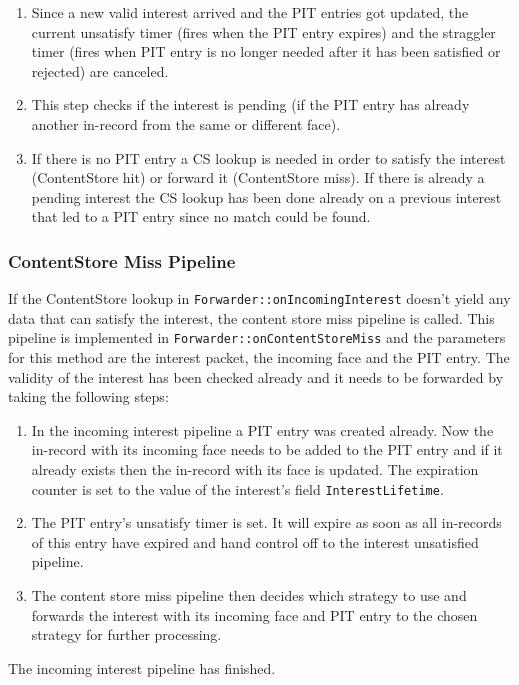 \begin{enumerate}
\item Since a new valid interest arrived and the PIT entries got updated, the current unsatisfy timer (fires when the PIT entry expires) and the straggler timer (fires when PIT entry is no longer needed after it has been satisfied or rejected) are canceled.
\item This step checks if the interest is pending (if the PIT entry has already another in-record from the same or different face).
\item If there is no PIT entry a CS lookup is needed in order to satisfy the interest (ContentStore hit) or forward it (ContentStore miss). If there is already a pending interest the CS lookup has been done already on a previous interest that led to a PIT entry since no match could be found.
\end{enumerate}

\subsubsection{ContentStore Miss Pipeline}

If the ContentStore lookup in \texttt{Forwarder::onIncomingInterest} doesn't yield any data that can satisfy the interest, the content store miss pipeline is called. This pipeline is implemented in \texttt{Forwarder::onContentStoreMiss} and the parameters for this method are the interest packet, the incoming face and the PIT entry. The validity of the interest has been checked already and it needs to be forwarded by taking the following steps:

\begin{enumerate}
\item In the incoming interest pipeline a PIT entry was created already. Now the in-record with its incoming face needs to be added to the PIT entry and if it already exists then the in-record with its face is updated. The expiration counter is set to the value of the interest's field \texttt{InterestLifetime}.
\item The PIT entry's unsatisfy timer is set. It will expire as soon as all in-records of this entry have expired and hand control off to the interest unsatisfied pipeline.
\item The content store miss pipeline then decides which strategy to use and forwards the interest with its incoming face and PIT entry to the chosen strategy for further processing.
\end{enumerate}

The incoming interest pipeline has finished.

